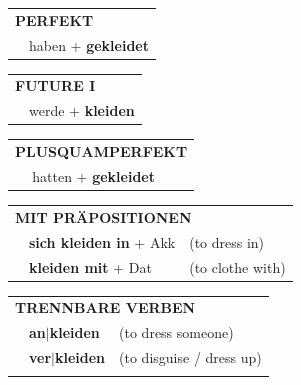 \documentclass[10pt,a4paper]{revtex4-2}
\begin{document}
\begin{verbbox}
    \vspace{10pt}

 \begin{tabular}{rl}
     \multicolumn{2}{l}{\textbf{PERFEKT}}\\
   & haben + \textbf{gekleidet}\\
  \end{tabular}
\hfill
   \begin{tabular}{rl}
    \multicolumn{2}{l}{\textbf{FUTURE I} }\\
   & werde + \textbf{kleiden}\\
  \end{tabular}
\hfill
   \begin{tabular}{rl}
      \multicolumn{2}{l}{\textbf{PLUSQUAMPERFEKT}}\\
   & hatten + \textbf{gekleidet}\\
  \end{tabular}

   \vspace{10pt}

   \begin{tabular}{lll}
      \multicolumn{3}{l}{\textbf{MIT PRÄPOSITIONEN}}\\
& \textbf{sich kleiden in} + Akk & (to dress in)\\
& \textbf{kleiden mit} + Dat & (to clothe with)\\
\end{tabular}
  \hfill
   \begin{tabular}{lll}
      \multicolumn{3}{l}{\textbf{TRENNBARE VERBEN}}\\
 & \textbf{an$|$kleiden} & (to dress someone)\\
 & \textbf{ver$|$kleiden} & (to disguise / dress up)\\
\vspace{10pt}
  \end{tabular}

  \vspace{-5pt}

\end{verbbox}
\end{document}

